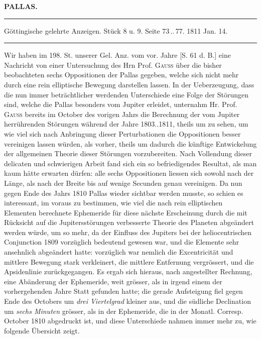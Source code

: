 \clearpage{}\hypertarget{native-327-lower}{}\label{native-327-lower}

\begin{center}\textbf{PALLAS.}\par\vspace{4pt}\hrule\vspace{4pt}\fontsize{10}{12}\selectfont Göttingische gelehrte Anzeigen. Stück 8 u. 9. Seite 73\,..\,77. 1811 Jan. 14.\par\vspace{4pt}\hrule\vspace{4pt}\end{center}

\par\indent Wir haben im 198. St. unserer Gel. Anz. vom vor. Jahre [S. 61 d. B.] eine Nachricht von einer Untersuchung des Hrn Prof. \textsc{Gauss} über die bisher beobachteten sechs Oppositionen der Pallas gegeben, welche sich nicht mehr durch eine rein elliptische Bewegung darstellen lassen. In der Ueberzeugung, dass die nun immer beträchtlicher werdenden Unterschiede eine Folge der Störungen sind, welche die Pallas besonders vom Jupiter erleidet, unternahm Hr. Prof. \textsc{Gauss} bereits im October des vorigen Jahrs die Berechnung der vom Jupiter herrührenden Störungen während der Jahre 1803..1811, theils um zu sehen, um wie viel sich nach Anbringung dieser Perturbationen die Oppositionen besser vereinigen lassen würden, als vorher, theils um dadurch die künftige Entwickelung der allgemeinen Theorie dieser Störungen vorzubereiten. Nach Vollendung dieser delicaten und schwierigen Arbeit fand sich ein so befriedigendes Resultat, als man kaum hätte erwarten dürfen: alle sechs Oppositionen liessen sich sowohl nach der Länge, als nach der Breite bis auf wenige Secunden genau vereinigen. Da nun gegen Ende des Jahrs 1810 Pallas wieder sichtbar werden musste, so schien es interessant, im voraus zu bestimmen, wie viel die nach rein elliptischen Elementen berechnete Ephemeride für diese nächste Erscheinung durch die mit Rücksicht auf die Jupitersstörungen verbesserte Theorie des Planeten abgeändert werden würde, um so mehr, da der Einfluss des Jupiters bei der heliocentrischen Conjunction 1809 vorzüglich bedeutend gewesen war, und die Elemente sehr ansehnlich abgeändert hatte: vorzüglich war nemlich die Excentricität und mittlere Bewegung stark verkleinert, die mittlere Entfernung vergrössert, und die Apsidenlinie zurückgegangen. Es ergab sich hieraus, nach angestellter Rechnung, eine Abänderung der Ephemeride, weit grösser, als in irgend einem der vorhergehenden Jahre Statt gefunden hatte; die gerade Aufsteigung fiel gegen Ende des Octobers um \emph{drei Viertelgrad} kleiner aus, und die südliche Declination um \emph{sechs Minuten} grösser, als in der Ephemeride, die in der Monatl. Corresp. October 1810 abgedruckt ist, und diese Unterschiede nahmen immer mehr zu, wie folgende Übersicht zeigt.
